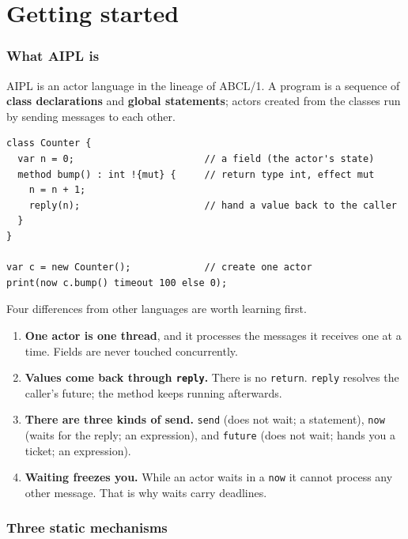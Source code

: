 \documentclass[11pt,a4paper]{article}
\begin{document}
\tableofcontents

\part{Getting started}
\label{part:start}

\section{What AIPL is}

AIPL is an actor language in the lineage of ABCL/1. A program is a sequence of
\textbf{class declarations} and \textbf{global statements}; actors created from
the classes run by sending messages to each other.

\begin{lstlisting}
class Counter {
  var n = 0;                       // a field (the actor's state)
  method bump() : int !{mut} {     // return type int, effect mut
    n = n + 1;
    reply(n);                      // hand a value back to the caller
  }
}

var c = new Counter();             // create one actor
print(now c.bump() timeout 100 else 0);
\end{lstlisting}

Four differences from other languages are worth learning first.

\begin{enumerate}
\item \textbf{One actor is one thread}, and it processes the messages it
  receives one at a time. Fields are never touched concurrently.
\item \textbf{Values come back through \texttt{reply}.} There is no
  \texttt{return}. \texttt{reply} resolves the caller's future; the method
  keeps running afterwards.
\item \textbf{There are three kinds of send.} \texttt{send} (does not wait; a
  statement), \texttt{now} (waits for the reply; an expression), and
  \texttt{future} (does not wait; hands you a ticket; an expression).
\item \textbf{Waiting freezes you.} While an actor waits in a \texttt{now} it
  cannot process any other message. That is why waits carry deadlines.
\end{enumerate}

\section{Three static mechanisms}
\end{document}
